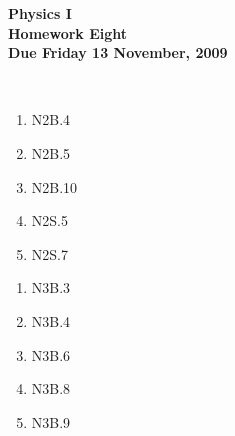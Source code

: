 \documentclass[12pt]{article}
\begin{document}
\pagestyle{empty}
 
\begin{center}
{\large {\bf Physics I}}\\
\medskip
{\large {\bf Homework Eight}}\\
\medskip
{ {\bf Due Friday 13  November, 2009}}\\
\end{center}

\hspace{2mm}\\


\begin{enumerate}
\setlength{\itemsep}{-1mm}
  \item N2B.4
  \item N2B.5
  \item N2B.10
  \item N2S.5
  \item N2S.7
\end{enumerate}


\begin{enumerate}
\setlength{\itemsep}{-1mm}
  \item N3B.3
  \item N3B.4
  \item N3B.6
  \item N3B.8
  \item N3B.9
\end{enumerate}
\end{document}
